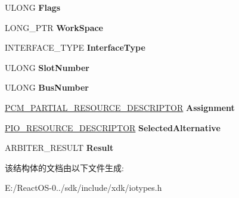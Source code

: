 \begin{DoxyCompactItemize}
U\+L\+O\+NG {\bfseries Flags}
\item 
\mbox{\label{struct___a_r_b_i_t_e_r___l_i_s_t___e_n_t_r_y_a928aa14b7752ec05a0f010a8f838c8b7}} 
L\+O\+N\+G\+\_\+\+P\+TR {\bfseries Work\+Space}
\item 
\mbox{\label{struct___a_r_b_i_t_e_r___l_i_s_t___e_n_t_r_y_aeb0e078389c6a0a67c36ac58226b4918}} 
I\+N\+T\+E\+R\+F\+A\+C\+E\+\_\+\+T\+Y\+PE {\bfseries Interface\+Type}
\item 
\mbox{\label{struct___a_r_b_i_t_e_r___l_i_s_t___e_n_t_r_y_ad869bf0a23e67d949532427bb67ac406}} 
U\+L\+O\+NG {\bfseries Slot\+Number}
\item 
\mbox{\label{struct___a_r_b_i_t_e_r___l_i_s_t___e_n_t_r_y_a0da84d69c6d43d0f34177b0c71fdd830}} 
U\+L\+O\+NG {\bfseries Bus\+Number}
\item 
\mbox{\label{struct___a_r_b_i_t_e_r___l_i_s_t___e_n_t_r_y_aef35a1df6cf50c6db214a5625ae408a6}} 
\hyperlink{struct___c_m___p_a_r_t_i_a_l___r_e_s_o_u_r_c_e___d_e_s_c_r_i_p_t_o_r}{P\+C\+M\+\_\+\+P\+A\+R\+T\+I\+A\+L\+\_\+\+R\+E\+S\+O\+U\+R\+C\+E\+\_\+\+D\+E\+S\+C\+R\+I\+P\+T\+OR} {\bfseries Assignment}
\item 
\mbox{\label{struct___a_r_b_i_t_e_r___l_i_s_t___e_n_t_r_y_a78b374dd5c0b3611507c677c58447f2d}} 
\hyperlink{struct___i_o___r_e_s_o_u_r_c_e___d_e_s_c_r_i_p_t_o_r}{P\+I\+O\+\_\+\+R\+E\+S\+O\+U\+R\+C\+E\+\_\+\+D\+E\+S\+C\+R\+I\+P\+T\+OR} {\bfseries Selected\+Alternative}
\item 
\mbox{\label{struct___a_r_b_i_t_e_r___l_i_s_t___e_n_t_r_y_a110aded62a1817bb1a3802549375a8de}} 
A\+R\+B\+I\+T\+E\+R\+\_\+\+R\+E\+S\+U\+LT {\bfseries Result}
\end{DoxyCompactItemize}


该结构体的文档由以下文件生成\+:\begin{DoxyCompactItemize}
\item 
E\+:/\+React\+O\+S-\/0../sdk/include/xdk/iotypes.\+h\end{DoxyCompactItemize}
